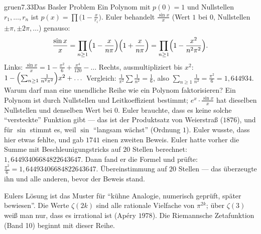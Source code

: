 \begin{loesungkarte}{gruen}{7.33}{Das Basler Problem}
Ein Polynom mit $p(0) = 1$ und Nullstellen $r_1, \dots, r_n$ ist $p(x) = \prod\bigl(1 - \frac x{r_i}\bigr)$. Euler behandelt $\frac{\sin x}x$ (Wert $1$ bei $0$, Nullstellen $\pm\pi, \pm2\pi, \dots$) genauso:
\[ \frac{\sin x}x = \prod_{n\ge1}\Bigl(1 - \frac x{n\pi}\Bigr)\Bigl(1 + \frac x{n\pi}\Bigr) = \prod_{n\ge1}\Bigl(1 - \frac{x^{2}}{n^{2}\pi^{2}}\Bigr). \]
Links: $\frac{\sin x}x = 1 - \frac{x^{2}}6 + \frac{x^{4}}{120} - \dots$ Rechts, ausmultipliziert bis $x^{2}$: $1 - \Bigl(\sum_{n\ge1}\frac1{n^{2}\pi^{2}}\Bigr)x^{2} + \dots$ Vergleich: $\frac1{\pi^{2}}\sum\frac1{n^{2}} = \frac16$, also $\sum_{n\ge1}\frac1{n^{2}} = \frac{\pi^{2}}6 = 1{,}644934$.
Warum darf man eine unendliche Reihe wie ein Polynom faktorisieren? Ein Polynom ist durch Nullstellen und Leitkoeffizient bestimmt; $e^{x}\cdot\frac{\sin x}x$ hat dieselben Nullstellen und denselben Wert bei $0$. Euler brauchte, dass es keine solche \enquote{versteckte} Funktion gibt --- das ist der Produktsatz von Weierstraß ($1876$), und für $\sin$ stimmt es, weil $\sin$ \enquote{langsam wächst} (Ordnung $1$). Euler wusste, dass hier etwas fehlte, und gab $1741$ einen zweiten Beweis.
Euler hatte vorher die Summe mit Beschleunigungstricks auf $20$ Stellen berechnet: $1{,}64493406684822643647$. Dann fand er die Formel und prüfte: $\frac{\pi^{2}}6 = 1{,}64493406684822643647$. Übereinstimmung auf $20$ Stellen --- das überzeugte ihn und alle anderen, bevor der Beweis stand.
\begin{mitnehmen}\kastentext
Eulers Lösung ist das Muster für \enquote{kühne Analogie, numerisch geprüft, später bewiesen}. Die Werte $\zeta(2k)$ sind alle rationale Vielfache von $\pi^{2k}$; über $\zeta(3)$ weiß man nur, dass es irrational ist (Apéry $1978$). Die Riemannsche Zetafunktion (Band 10) beginnt mit dieser Reihe.
\end{mitnehmen}
\end{loesungkarte}

